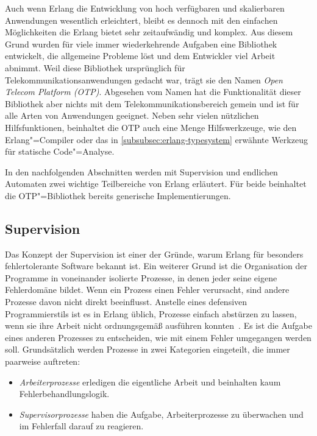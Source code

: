 Auch wenn Erlang die Entwicklung von hoch verfügbaren und skalierbaren Anwendungen wesentlich erleichtert, bleibt es dennoch mit den einfachen Möglichkeiten die Erlang bietet sehr zeitaufwändig und komplex. Aus diesem Grund wurden für viele immer wiederkehrende Aufgaben eine Bibliothek entwickelt, die allgemeine Probleme löst und dem Entwickler viel Arbeit abnimmt.  Weil diese Bibliothek ursprünglich für Telekommunikationsanwendungen gedacht war, trägt sie den Namen \textit{Open Telecom Platform (OTP)}. Abgesehen vom Namen hat die Funktionalität dieser Bibliothek aber nichts mit dem Telekommunikationsbereich gemein und ist für alle Arten von Anwendungen geeignet. Neben sehr vielen nützlichen Hilfsfunktionen, beinhaltet die OTP auch eine Menge Hilfswerkzeuge, wie \zB den Erlang"=Compiler oder das in \ref{subsubsec:erlang-typesystem} erwähnte Werkzeug für statische Code"=Analyse.

In den nachfolgenden Abschnitten werden mit Supervision und endlichen Automaten zwei wichtige Teilbereiche von Erlang erläutert. Für beide beinhaltet die OTP"=Bibliothek bereits generische Implementierungen. 

\subsection{Supervision}
\label{subsec:erlang-supervision}

Das Konzept der Supervision ist einer der Gründe, warum 
Erlang für besonders fehlertolerante Software bekannt ist. Ein weiterer Grund ist die Organisation der Programme in voneinander isolierte Prozesse, in denen jeder seine eigene Fehlerdomäne bildet. Wenn ein Prozess einen Fehler verursacht, sind andere Prozesse davon nicht direkt beeinflusst. Anstelle eines defensiven Programmierstils ist es in Erlang üblich, Prozesse einfach abstürzen zu lassen, wenn sie ihre Arbeit nicht ordnungsgemäß ausführen konnten~\cite[104]{armstrong03}. Es ist die Aufgabe eines anderen Prozesses zu entscheiden, wie mit einem Fehler umgegangen werden soll. Grundsätzlich werden Prozesse in zwei Kategorien eingeteilt, die immer paarweise auftreten:

\begin{itemize}
	\item \textit{Arbeiterprozesse} erledigen die eigentliche Arbeit und beinhalten kaum Fehlerbehandlungslogik.
	\item \textit{Supervisorprozesse} haben die Aufgabe, Arbeiterprozesse zu überwachen und im Fehlerfall darauf zu reagieren.
\end{itemize}


